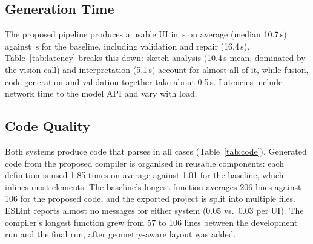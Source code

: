 \subsection{Generation Time}
The proposed pipeline produces a usable UI in \GenerationTimeMsPipeline{}\,s on average (median 10.7\,s) against \GenerationTimeMsBaseline{}\,s for the baseline, including validation and repair (16.4\,s). Table~\ref{tab:latency} breaks this down: sketch analysis (10.4\,s mean, dominated by the vision call) and interpretation (5.1\,s) account for almost all of it, while fusion, code generation and validation together take about 0.5\,s. Latencies include network time to the model API and vary with load.



\subsection{Code Quality}
Both systems produce code that parses in all cases (Table~\ref{tab:code}). Generated code from the proposed compiler is organised in reusable components: each definition is used 1.85 times on average against 1.01 for the baseline, which inlines most elements. The baseline's longest function averages 206 lines against 106 for the proposed code, and the exported project is split into multiple files. ESLint reports almost no messages for either system (0.05 vs.\ 0.03 per UI). The compiler's longest function grew from 57 to 106 lines between the development run and the final run, after geometry-aware layout was added.


